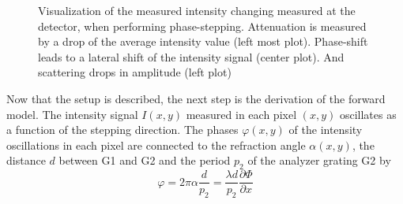 \begin{figure}
	\centering
	\caption{Visualization of the measured intensity changing measured at the detector, when
		performing phase-stepping. Attenuation is measured by a drop of the average
		intensity value (left most plot). Phase-shift leads to a lateral shift of the
		intensity signal (center plot). And scattering drops in amplitude (left plot)}%
	\label{fig:grating_setup_what_happens}
\end{figure}

Now that the setup is described, the next step is the derivation of the forward model. The intensity
signal \(I(x, y)\) measured in each pixel \((x, y)\) oscillates as a function of the stepping
direction. The phases \(\varphi(x, y)\) of the intensity oscillations in each pixel are connected to
the refraction angle \(\alpha(x, y)\), the distance \(d\) between G1 and G2 and the period \(p_2\)
of the analyzer grating G2 by~\cite{weitkamp_x-ray_2005}
\[ \varphi = 2 \pi \alpha \frac{d}{p_2} = \frac{\lambda d}{p_2} \frac{\partial \Phi}{\partial x} \]

